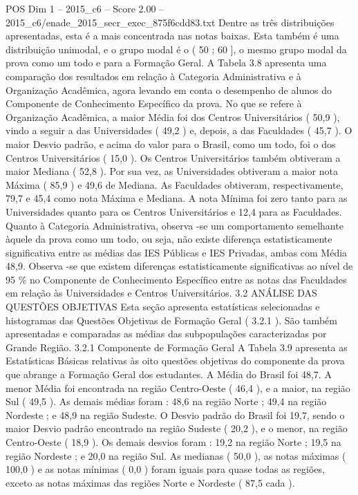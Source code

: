 \begin{textsample}{POS Dim 1 – 2015\_c6 – Score 2.00 – 2015\_c6/enade\_2015\_secr\_exec\_875f6cdd83.txt}
Dentre as três distribuições apresentadas, esta é a mais concentrada nas notas baixas.
Esta também é uma distribuição unimodal, e o grupo modal é o ( 50 ; 60 ], o mesmo grupo modal da prova como um todo e para a Formação Geral.
A Tabela 3.8 apresenta uma comparação dos resultados em relação à Categoria Administrativa e à Organização Acadêmica, agora levando em conta o desempenho de alunos do Componente de Conhecimento Específico da prova.
No que se refere à Organização Acadêmica, a maior Média foi dos Centros Universitários ( 50,9 ), vindo a seguir a das Universidades ( 49,2 ) e, depois, a das Faculdades ( 45,7 ).
O maior Desvio padrão, e acima do valor para o Brasil, como um todo, foi o dos Centros Universitários ( 15,0 ).
Os Centros Universitários também obtiveram a maior Mediana ( 52,8 ).
Por sua vez, as Universidades obtiveram a maior nota Máxima ( 85,9 ) e 49,6 de Mediana.
As Faculdades obtiveram, respectivamente, 79,7 e 45,4 como nota Máxima e Mediana.
A nota Mínima foi zero tanto para as Universidades quanto para os Centros Universitários e 12,4 para as Faculdades.
Quanto à Categoria Administrativa, observa -se um comportamento semelhante àquele da prova como um todo, ou seja, não existe diferença estatisticamente significativa entre as médias das IES Públicas e IES Privadas, ambas com Média 48,9.
Observa -se que existem diferenças estatisticamente significativas ao nível de 95 \% no Componente de Conhecimento Específico entre as notas das Faculdades em relação às Universidades e Centros Universitários. 3.2 ANÁLISE DAS QUESTÕES OBJETIVAS Esta seção apresenta estatísticas selecionadas e histogramas das Questões Objetivas de Formação Geral ( 3.2.1 ).
São também apresentadas e comparadas as médias das subpopulações caracterizadas por Grande Região. 3.2.1 Componente de Formação Geral A Tabela 3.9 apresenta as Estatísticas Básicas relativas às oito questões objetivas do componente da prova que abrange a Formação Geral dos estudantes.
A Média do Brasil foi 48,7.
A menor Média foi encontrada na região Centro-Oeste ( 46,4 ), e a maior, na região Sul ( 49,5 ).
As demais médias foram : 48,6 na região Norte ; 49,4 na região Nordeste ; e 48,9 na região Sudeste.
O Desvio padrão do Brasil foi 19,7, sendo o maior Desvio padrão encontrado na região Sudeste ( 20,2 ), e o menor, na região Centro-Oeste ( 18,9 ).
Os demais desvios foram : 19,2 na região Norte ; 19,5 na região Nordeste ; e 20,0 na região Sul.
As medianas ( 50,0 ), as notas máximas ( 100,0 ) e as notas mínimas ( 0,0 ) foram iguais para quase todas as regiões, exceto as notas máximas das regiões Norte e Nordeste ( 87,5 cada ).

\end{textsample}
